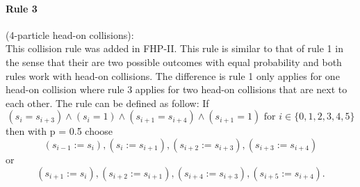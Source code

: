 \documentclass[a4paper,10pt]{article}
\begin{document}
\paragraph{Rule 3}(4-particle head-on collisions):\\
This collision rule was added in FHP-II. This rule is similar to that of rule 1 in the sense that their are two possible outcomes with equal probability and both rules work with head-on collisions. The difference is rule 1 only applies for one head-on collision where rule 3 applies for two head-on collisions that are next to each other. The rule can be defined as follow: If \[(s_{i} = s_{i + 3})\wedge(s_{i} = 1)\wedge(s_{i + 1} = s_{i + 4})\wedge(s_{i + 1} = 1) \mbox{ for } i \in \{0, 1, 2, 3, 4, 5\}\] then with p = 0.5 choose 
\[ (s_{i - 1} := s_{i}), (s_{i } := s_{i + 1}),(s_{i + 2} := s_{i + 3}), (s_{i + 3} := s_{i + 4})\]
or
\[ (s_{i + 1} := s_{i}), (s_{i + 2} := s_{i + 1}),(s_{i + 4} := s_{i + 3}), (s_{i + 5} := s_{i + 4}).\]
\end{document}
